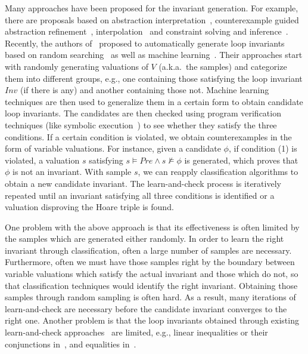 Many approaches have been proposed for the invariant generation.
For example, there are proposals based on abstraction interpretation~\cite{cousot1978automatic,mine2006octagon,cousot1979systematic,karr1976affine,vincent2009subpolyhedra}, counterexample guided abstraction refinement~\cite{henzinger2003software,thomas2001slam,edmund2003counterexample}, interpolation~\cite{kenneth2010lazy,thomas2004abstractions,kenneth2003interpolation,Kenneth2006lazy} and constraint solving and inference~\cite{ashutosh2009invgen,michael2003linear,sumit2009constraint}.
Recently, the authors of~\cite{sharma2012interpolants,sharma2013verification,DBLP:conf/esop/0001GHALN13,sharma2014invariant} proposed to automatically generate loop invariants based on random searching~\cite{sharma2014invariant} as well as machine learning~\cite{sharma2012interpolants}.
Their approaches start with randomly generating valuations of $V$ (a.k.a.~the samples) and categorize them into different groups, e.g., one containing those satisfying the loop invariant $\mathit{Inv}$ (if there is any) and another containing those not. Machine learning techniques are then used to generalize them in a certain form to obtain candidate loop invariants.
The candidates are then checked using program verification techniques (like symbolic execution~\cite{symbolic}) to see whether they satisfy the three conditions. If a certain condition is violated, we obtain counterexamples in the form of variable valuations.
For instance, given a candidate $\phi$, if condition (1) is violated, a valuation $s$ satisfying $s {\models} Pre {\land} s {\not \models} \phi$ is generated, which proves that $\phi$ is not an invariant.
With sample $s$, we can reapply classification algorithms to obtain a new candidate invariant. The learn-and-check process is iteratively repeated until an invariant satisfying all three conditions is identified or a valuation disproving the Hoare triple is found.

One problem with the above approach is that its effectiveness is often limited by the samples which are generated either randomly. In order to learn the right invariant through classification, often a large number of samples are necessary. Furthermore, often we must have those samples right by the boundary between variable valuations which satisfy the actual invariant and those which do not, so that classification techniques would identify the right invariant. Obtaining those samples through random sampling is often hard. As a result, many iterations of learn-and-check are necessary before the candidate invariant converges to the right one. Another problem is that the loop invariants obtained through existing learn-and-check approaches~\cite{sharma2012interpolants,sharma2013verification,DBLP:conf/esop/0001GHALN13,sharma2014invariant} are limited, e.g., linear inequalities or their conjunctions in~\cite{sharma2012interpolants}, and equalities in~\cite{DBLP:conf/esop/0001GHALN13}.

